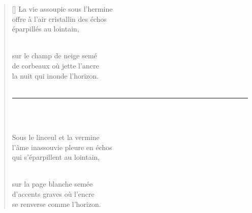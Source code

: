 \documentclass[11pt,a4paper]{article}
\begin{document}

\settowidth{\versewidth}{offre à l'air cristallin des échos}

\bigskip\bigskip

\begin{verse}[\versewidth]
La vie assoupie sous l'hermine \\
offre à l'air cristallin des échos \\
éparpillés au lointain, \\ \

sur le champ de neige semé \\
de corbeaux où jette l'ancre \\
la nuit qui inonde l'horizon. \\ \

\rule{0.4\textwidth}{0.4pt}
\\ \

Sous le linceul et la vermine \\
l'âme inassouvie pleure en échos \\
qui s'éparpillent au lointain, \\ \

sur la page blanche semée \\
d'accents graves où l'encre \\
se renverse comme l'horizon.
\end{verse}
\end{document}
